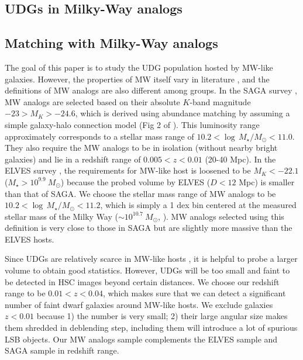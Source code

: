 \documentclass[twocolumn,astrosymb,twocolappendix]{aastex631}
\begin{document}
\begin{CJK*}{UTF8}{gbsn}
\section{UDGs in Milky-Way analogs}

\subsection{Matching with Milky-Way analogs}\label{sec:match}
The goal of this paper is to study the UDG population hosted by MW-like galaxies. However, the properties of MW itself vary in literature \citep{Licquia2015,Bland-Hawthorn2016}, and the definitions of MW analogs are also different among groups. In the SAGA survey \citep{SAGA-I,SAGA-II}, MW analogs are selected based on their absolute $K$-band magnitude $-23 > M_K > -24.6$, which is derived using abundance matching by assuming a simple galaxy-halo connection model (Fig 2 of \citealt{SAGA-I}). This luminosity range approximately corresponds to a stellar mass range of $10.2 < \log\, M_\star/M_\odot < 11.0$. They also require the MW analogs to be in isolation (without nearby bright galaxies) and lie in a redshift range of $0.005 < z < 0.01$ (20-40 Mpc). In the ELVES survey \citep{ELVES-I,ELVES-II,CarlstenELVES2022}, the requirements for MW-like host is loosened to be $M_K < -22.1$ ($M_\star > 10^{9.9}\ M_\odot$) because the probed volume by ELVES ($D<12$ Mpc) is smaller than that of SAGA. We choose the stellar mass range of MW analogs to be $10.2 < \log\, M_\star/M_\odot < 11.2$, which is simply a 1 dex bin centered at the measured stellar mass of the Milky Way ($\sim 10^{10.7}\ M_\odot$, \citealt{Licquia2015}). MW analogs selected using this definition is very close to those in SAGA but are slightly more massive than the ELVES hosts.

Since UDGs are relatively scarce in MW-like hosts \citep{SAGA-II,CarlstenELVES2022}, it is helpful to probe a larger volume to obtain good statistics. However, UDGs will be too small and faint to be detected in HSC images beyond certain distances. We choose our redshift range to be $0.01 < z < 0.04$, which makes sure that we can detect a significant number of faint dwarf galaxies around MW-like hosts. We exclude galaxies $z<0.01$ because 1) the number is very small; 2) their large angular size makes them shredded in deblending step, including them will introduce a lot of spurious LSB objects. Our MW analogs sample complements the ELVES sample and SAGA sample in redshift range. 


\end{CJK*}
\end{document}

